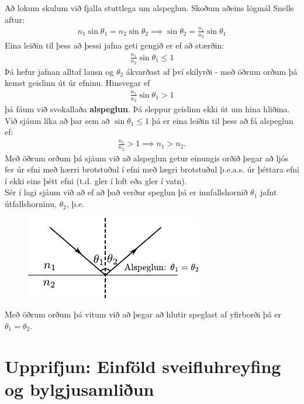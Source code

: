Að lokum skulum við fjalla stuttlega um alspeglun. Skoðum aðeins lögmál Snells aftur:
\begin{align*}
    n_1 \sin\theta_1 = n_2 \sin\theta_2 \implies \sin\theta_2 = \frac{n_1}{n_2}\sin\theta_1
\end{align*}
Eina leiðin til þess að þessi jafna geti gengið er ef að stærðin:
\begin{align*}
    \frac{n_1}{n_2}\sin\theta_1 \leq 1
\end{align*}
Þá hefur jafnan alltaf lausn og $\theta_2$ ákvarðast af því skilyrði - með öðrum orðum þá kemst geislinn út úr efninu. Hinsvegar ef
\begin{align*}
    \frac{n_1}{n_2}\sin\theta_1 > 1
\end{align*}
þá fáum við svokallaða \textbf{alspeglun}. Þá sleppur geislinn ekki út um hina hliðina. Við sjáum líka að þar sem að $\sin\theta_1 \leq 1$ þá er eina leiðin til þess að fá alspeglun ef:
\begin{align*}
    \frac{n_1}{n_2} > 1 \implies n_1 > n_2.
\end{align*}
Með öðrum orðum þá sjáum við að alspeglun getur einungis orðið þegar að ljós fer úr efni með hærri brotstuðul í efni með lægri brotstuðul þ.e.a.s. úr þéttara efni í ekki eins þétt efni (t.d. gler í loft eða gler í vatn). \\

Sér í lagi sjáum við að ef að það verður speglun þá er innfallshornið $\theta_1$ jafnt útfallshorninu, $\theta_2$, þ.e.

\begin{figure}[H]
    \centering
    \includegraphics[scale = 1.5]{figures/snell3.pdf}
\end{figure}
Með öðrum orðum þá vitum við að þegar að hlutir speglast af yfirborði þá er $\theta_1 = \theta_2$.

\section{Upprifjun: Einföld sveifluhreyfing og bylgjusamliðun}

